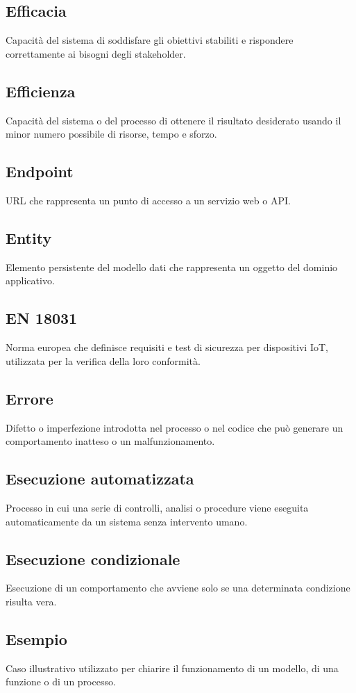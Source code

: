 \documentclass[a4paper,12pt]{article}
\begin{document}
          \subsection*{Efficacia}
			Capacità del sistema di soddisfare gli obiettivi stabiliti e rispondere correttamente ai bisogni degli stakeholder.
          \subsection*{Efficienza}
			Capacità del sistema o del processo di ottenere il risultato desiderato usando il minor numero possibile di risorse, tempo e sforzo.
          \subsection*{Endpoint}
			URL che rappresenta un punto di accesso a un servizio web o API.
          \subsection*{Entity}
			Elemento persistente del modello dati che rappresenta un oggetto del dominio applicativo.
          \subsection*{EN 18031}
			Norma europea che definisce requisiti e test di sicurezza per dispositivi IoT, utilizzata per la verifica della loro conformità.
          \subsection*{Errore}
			Difetto o imperfezione introdotta nel processo o nel codice che può generare un comportamento inatteso o un malfunzionamento.
          \subsection*{Esecuzione automatizzata}
			Processo in cui una serie di controlli, analisi o procedure viene eseguita automaticamente da un sistema senza intervento umano.
          \subsection*{Esecuzione condizionale}
			Esecuzione di un comportamento che avviene solo se una determinata condizione risulta vera.
          \subsection*{Esempio}
			Caso illustrativo utilizzato per chiarire il funzionamento di un modello, di una funzione o di un processo.
\end{document}
